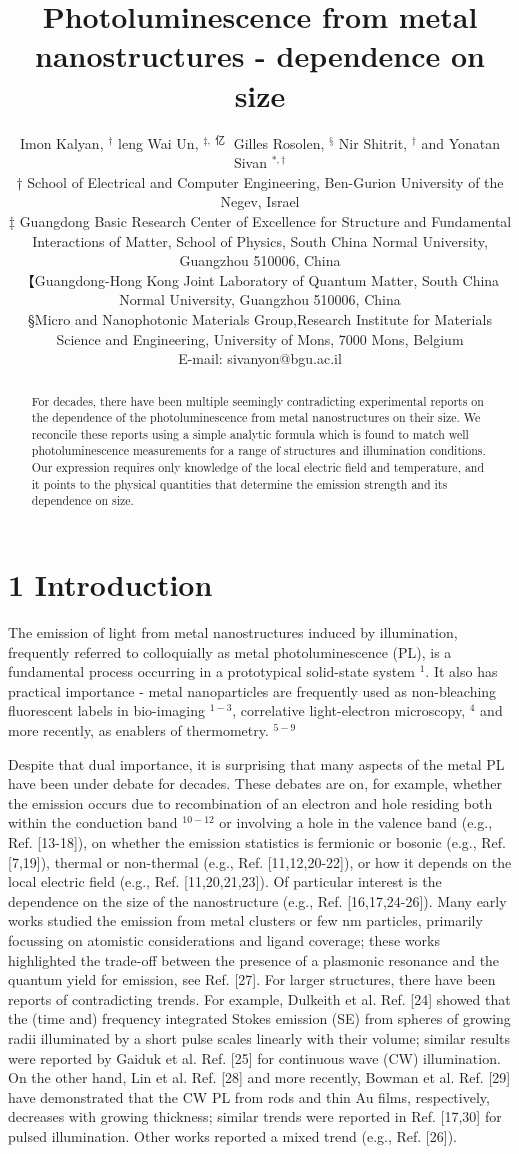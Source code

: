 \documentclass[10pt]{article}
\title{Photoluminescence from metal nanostructures - dependence on size }
\author{Imon Kalyan, ${ }^{\dagger}$ leng Wai Un, ${ }^{\ddagger, \text { 亿 }}$ Gilles Rosolen, ${ }^{§}$ Nir Shitrit, ${ }^{\dagger}$ and Yonatan Sivan ${ }^{*, \dagger}$\\
† School of Electrical and Computer Engineering, Ben-Gurion University of the Negev, Israel\\
‡ Guangdong Basic Research Center of Excellence for Structure and Fundamental Interactions of Matter, School of Physics, South China Normal University, Guangzhou 510006, China\\
【Guangdong-Hong Kong Joint Laboratory of Quantum Matter, South China Normal University, Guangzhou 510006, China\\
§Micro and Nanophotonic Materials Group,Research Institute for Materials Science and Engineering, University of Mons, 7000 Mons, Belgium\\
E-mail: sivanyon@bgu.ac.il}
\date{}
\begin{document}
\maketitle
\captionsetup{singlelinecheck=false}


\begin{abstract}
For decades, there have been multiple seemingly contradicting experimental reports on the dependence of the photoluminescence from metal nanostructures on their size. We reconcile these reports using a simple analytic formula which is found to match well photoluminescence measurements for a range of structures and illumination conditions. Our expression requires only knowledge of the local electric field and temperature, and it points to the physical quantities that determine the emission strength and its dependence on size.
\end{abstract}

\section*{1 Introduction}
The emission of light from metal nanostructures induced by illumination, frequently referred to colloquially as metal photoluminescence (PL), is a fundamental process occurring in a prototypical solid-state system ${ }^{1}$. It also has practical importance - metal nanoparticles are frequently used as non-bleaching fluorescent labels in bio-imaging ${ }^{1-3}$, correlative light-electron microscopy, ${ }^{4}$ and more recently, as enablers of thermometry. ${ }^{5-9}$

Despite that dual importance, it is surprising that many aspects of the metal PL have been under debate for decades. These debates are on, for example, whether the emission occurs due to recombination of an electron and hole residing both within the conduction band ${ }^{10-12}$ or involving a hole in the valence band (e.g., Ref. [13-18]), on whether the emission statistics is fermionic or bosonic (e.g., Ref. [7,19]), thermal or non-thermal (e.g., Ref. [11,12,20-22]), or how it depends on the local electric field (e.g., Ref. [11,20,21,23]). Of particular interest is the dependence on the size of the nanostructure (e.g., Ref. [16,17,24-26]). Many early works studied the emission from metal clusters or few nm particles, primarily focussing on atomistic considerations and ligand coverage; these works highlighted the trade-off between the presence of a plasmonic resonance and the quantum yield for emission, see Ref. [27]. For larger structures, there have been reports of contradicting trends. For example, Dulkeith et al. Ref. [24] showed that the (time and) frequency integrated Stokes emission (SE) from spheres of growing radii illuminated by a short pulse scales linearly with their volume; similar results were reported by Gaiduk et al. Ref. [25] for continuous wave (CW) illumination. On the other hand, Lin et al. Ref. [28] and more recently, Bowman et al. Ref. [29] have demonstrated that the CW PL from rods and thin Au films, respectively, decreases with growing thickness; similar trends were reported in Ref. [17,30] for pulsed illumination. Other works reported a mixed trend (e.g., Ref. [26]).
\end{document}
